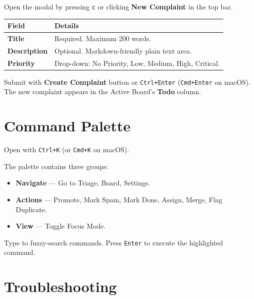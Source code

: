 \documentclass[12pt,a4paper]{report}
\begin{document}
Open the modal by pressing \texttt{c} or clicking \textbf{New Complaint}
in the top bar.

\begin{longtable}{>{\bfseries}p{3cm} p{9cm}}
\toprule
Field & Details \\
\midrule
\endhead
Title & Required. Maximum 200 words. \\
Description & Optional. Markdown-friendly plain text area. \\
Priority & Drop-down: No Priority, Low, Medium, High, Critical. \\
\bottomrule
\end{longtable}

Submit with \textbf{Create Complaint} button or \texttt{Ctrl+Enter}
(\texttt{Cmd+Enter} on macOS).  The new complaint appears in the Active Board's
\textbf{Todo} column.

\section{Command Palette}

Open with \texttt{Ctrl+K} (or \texttt{Cmd+K} on macOS).

The palette contains three groups:
\begin{itemize}
  \item \textbf{Navigate} --- Go to Triage, Board, Settings.
  \item \textbf{Actions} --- Promote, Mark Spam, Mark Done, Assign, Merge,
    Flag Duplicate.
  \item \textbf{View} --- Toggle Focus Mode.
\end{itemize}

Type to fuzzy-search commands.  Press \texttt{Enter} to execute the highlighted
command.

\section{Troubleshooting}
\end{document}
